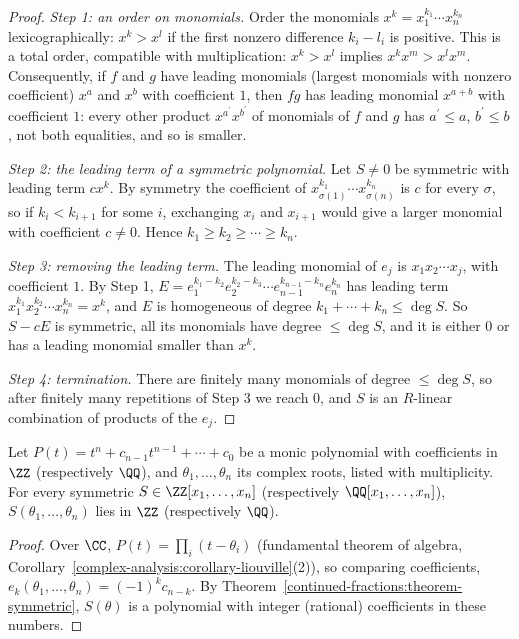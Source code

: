 \begin{proof}
\emph{Step 1: an order on monomials.} Order the monomials $x^k = x_1^{k_1}\cdots x_n^{k_n}$ lexicographically: $x^k > x^l$ if the first nonzero difference $k_i - l_i$ is positive. This is a total order,
compatible with multiplication: $x^k > x^l$ implies $x^kx^m > x^lx^m$. Consequently, if $f$ and $g$ have leading monomials (largest monomials with nonzero coefficient) $x^a$ and $x^b$ with
coefficient $1$, then $fg$ has leading monomial $x^{a+b}$ with coefficient $1$: every other product $x^{a^{\prime}}x^{b^{\prime}}$ of monomials of $f$ and $g$ has $a^{\prime} \leq a$, $b^{\prime} \leq b$,
not both equalities, and so is smaller.

\emph{Step 2: the leading term of a symmetric polynomial.} Let $S \neq 0$ be symmetric with leading term $cx^k$. By symmetry the coefficient of $x_{\sigma(1)}^{k_1}\cdots x_{\sigma(n)}^{k_n}$ is $c$ for every
$\sigma$, so if $k_i < k_{i+1}$ for some $i$, exchanging $x_i$ and $x_{i+1}$ would give a larger monomial with coefficient $c \neq 0$. Hence $k_1 \geq k_2 \geq \cdots \geq k_n$.

\emph{Step 3: removing the leading term.} The leading monomial of $e_j$ is $x_1x_2\cdots x_j$, with coefficient $1$. By Step 1,
$E = e_1^{k_1 - k_2}e_2^{k_2 - k_3}\cdots e_{n-1}^{k_{n-1} - k_n}e_n^{k_n}$ has leading term $x_1^{k_1}x_2^{k_2}\cdots x_n^{k_n} = x^k$, and $E$ is homogeneous of degree $k_1 + \cdots + k_n \leq \deg S$. So
$S - cE$ is symmetric, all its monomials have degree $\leq \deg S$, and it is either $0$ or has a leading monomial smaller than $x^k$.

\emph{Step 4: termination.} There are finitely many monomials of degree $\leq \deg S$, so after finitely many repetitions of Step 3 we reach $0$, and $S$ is an $R$-linear combination of products of
the $e_j$.
\end{proof}

\begin{corollary}\label{continued-fractions:corollary-symmetric-roots}
Let $P(t) = t^n + c_{n-1}t^{n-1} + \cdots + c_0$ be a monic polynomial with coefficients in $\ZZ$ (respectively $\QQ$), and $\theta_1, \ldots, \theta_n$ its complex roots, listed with multiplicity.
For every symmetric $S \in \ZZ[x_1, \ldots, x_n]$ (respectively $\QQ[x_1, \ldots, x_n]$), $S(\theta_1, \ldots, \theta_n)$ lies in $\ZZ$ (respectively $\QQ$).
\end{corollary}

\begin{proof}
Over $\CC$, $P(t) = \prod_i(t - \theta_i)$ (fundamental theorem of algebra, Corollary~\ref{complex-analysis:corollary-liouville}(2)), so comparing
coefficients, $e_k(\theta_1, \ldots, \theta_n) = (-1)^kc_{n-k}$. By Theorem~\ref{continued-fractions:theorem-symmetric}, $S(\theta)$ is a polynomial with integer (rational) coefficients in these numbers.
\end{proof}

